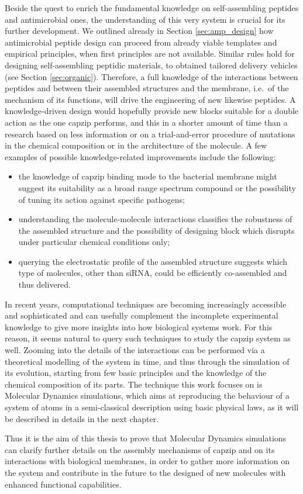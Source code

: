 Beside the quest to enrich the fundamental knowledge on self-assembling peptides and antimicrobial ones, the understanding of this very system is crucial for its further development. We outlined already in Section \ref{sec:amp_design} how antimicrobial peptide design can proceed from already viable templates and empirical principles, when first principles are not available. Similar rules hold for designing self-assembling peptidic materials, to obtained tailored delivery vehicles (see Section \ref{sec:organic}).
%
Therefore, a full knowledge of the interactions between peptides and between their assembled structures and the membrane, i.e.\ of the mechanism of its functions, will drive the engineering of new likewise peptides. A knowledge-driven design would hopefully provide new blocks suitable for a double action as the one capzip performs, and this in a shorter amount of time than a research based on less information or on a trial-and-error procedure of mutations in the chemical composition or in the architecture of the molecule. A few examples of possible knowledge-related improvements include the following:
\begin{itemize}
\item the knowledge of capzip binding mode to the bacterial membrane might suggest its suitability as a broad range spectrum compound or the possibility of tuning its action against specific pathogens;
\item understanding the molecule-molecule interactions classifies the robustness of the assembled structure and the possibility of designing block which disrupts under particular chemical conditions only;
\item querying the electrostatic profile of the assembled structure suggests which type of molecules, other than siRNA, could be efficiently co-assembled and thus delivered.
\end{itemize}

In recent years, computational techniques are becoming increasingly accessible and sophisticated and can usefully complement the incomplete experimental knowledge to give more insights into how biological systems work. For this reason, it seems natural to query such techniques to study the capzip system as well. Zooming into the details of the interactions can be performed via a theoretical modelling of the system in time, and thus through the simulation of its evolution, starting from few basic principles and the knowledge of the chemical composition of its parts. The technique this work focuses on is Molecular Dynamics simulations, which aims at reproducing the behaviour of a system of atoms in a semi-classical description using basic physical laws, as it will be described in details in the next chapter.

Thus it is the aim of this thesis to prove that Molecular Dynamics simulations can clarify further details on the assembly mechanisms of capzip and on its interactions with biological membranes, in order to gather more information on the system and contribute in the future to the designed of new molecules with enhanced functional capabilities.
